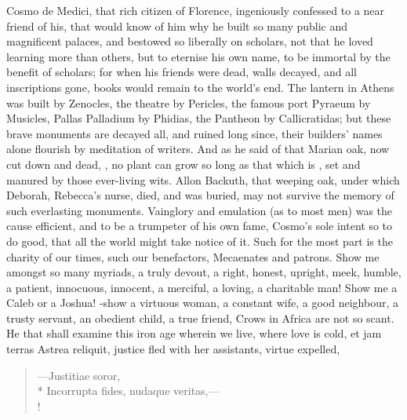 {\textlatin{Cosmo de Medici}, that rich citizen of Florence, ingeniously
confessed to a near friend of his, that would know of him why he built
so many public and magnificent palaces, and bestowed so liberally on
scholars, not that he loved learning more than others, but to
eternise his own name, to be immortal by the benefit of scholars;
for when his friends were dead, walls decayed, and all inscriptions
gone, books would remain to the world's end. The lantern in
Athens was built by Zenocles, the theatre by Pericles, the famous
port Pyraeum by Musicles, Pallas Palladium by Phidias, the Pantheon by
Callicratidas; but these brave monuments are decayed all, and ruined
long since, their builders' names alone flourish by meditation of
writers. And as he said of that Marian oak, now cut down and
dead, , no plant can grow so long as that which
is , set and manured by those ever-living wits. Allon
Backuth, that weeping oak, under which Deborah, Rebecca's nurse, died,
and was buried, may not survive the memory of such everlasting
monuments. Vainglory and emulation (as to most men) was the cause
efficient, and to be a trumpeter of his own fame, Cosmo's sole intent
so to do good, that all the world might take notice of it. Such for the
most part is the charity of our times, such our benefactors, Mecaenates
and patrons. Show me amongst so many myriads, a truly devout, a right,
honest, upright, meek, humble, a patient, innocuous, innocent, a
merciful, a loving, a charitable man! 
Show me a Caleb or a Joshua! -show a virtuous woman,
a constant wife, a good neighbour, a trusty servant, an obedient child,
a true friend, \etc{} Crows in Africa are not so scant. He that shall
examine this iron age wherein we live, where love is cold, et jam
terras Astrea reliquit, justice fled with her assistants, virtue
expelled,
%
\begin{latin}
\begin{verse}
---Justitiae soror,\\*
Incorrupta fides, nudaque veritas,---\\!
\end{verse}
\end{latin}

}
